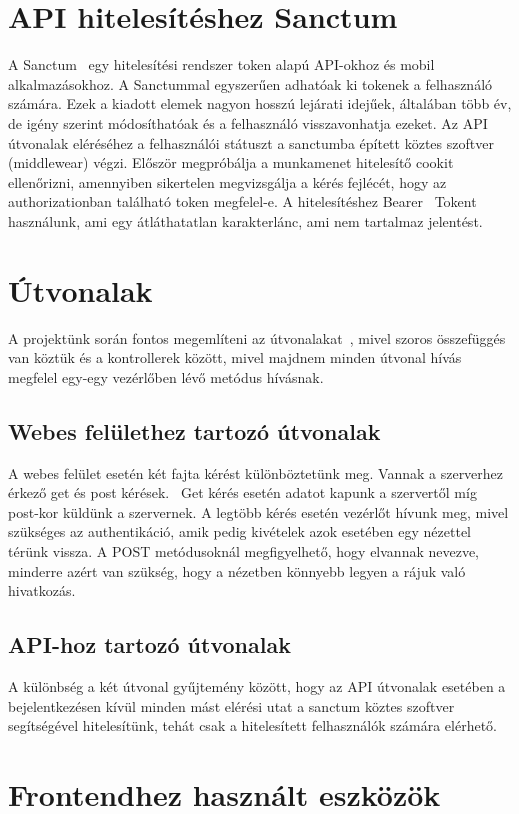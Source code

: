 \documentclass[
]{thesis-ekf}
\theoremstyle{definition}
\theoremstyle{remark}
\begin{document}
\section{API hitelesítéshez Sanctum}

A Sanctum~\cite{laravel_sanctum} egy hitelesítési rendszer token alapú API-okhoz és mobil alkalmazásokhoz. A Sanctummal egyszerűen adhatóak ki tokenek a felhasználó számára. Ezek a kiadott elemek nagyon hosszú lejárati idejűek, általában több év, de igény szerint módosíthatóak és a felhasználó visszavonhatja ezeket. Az API útvonalak eléréséhez a felhasználói státuszt a sanctumba épített köztes szoftver (middlewear) végzi. Először megpróbálja a munkamenet hitelesítő cookit ellenőrizni, amennyiben sikertelen megvizsgálja a kérés fejlécét, hogy az authorizationban található token megfelel-e. A hitelesítéshez Bearer~\cite{bearer_token} Tokent használunk, ami egy átláthatatlan karakterlánc, ami nem tartalmaz jelentést.

\section{Útvonalak}
A projektünk során fontos megemlíteni az útvonalakat~\cite{laravel_route}, mivel szoros összefüggés van köztük és a kontrollerek között, mivel majdnem minden útvonal hívás megfelel egy-egy vezérlőben lévő metódus hívásnak. 
\subsection{Webes felülethez tartozó útvonalak}
A webes felület esetén két fajta kérést különböztetünk meg. Vannak a szerverhez érkező get és post kérések.~\cite{get_post_difference} Get kérés esetén adatot kapunk a szervertől míg post-kor küldünk a szervernek. A legtöbb kérés esetén vezérlőt hívunk meg, mivel szükséges az authentikáció, amik pedig kivételek azok esetében egy nézettel térünk vissza. A POST metódusoknál megfigyelhető, hogy elvannak nevezve, minderre azért van szükség, hogy a nézetben könnyebb legyen a rájuk való hivatkozás. 
\subsection{API-hoz tartozó útvonalak}
A különbség a két útvonal gyűjtemény között, hogy az API útvonalak esetében a bejelentkezésen kívül minden mást elérési utat a sanctum köztes szoftver segítségével hitelesítünk, tehát csak a hitelesített felhasználók számára elérhető. 

\section{Frontendhez használt eszközök}
\end{document}
